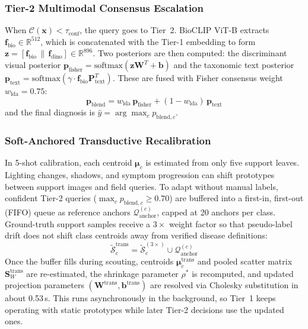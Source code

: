 \documentclass[preprint,12pt]{elsarticle}
\begin{document}
\subsubsection{Tier-2 Multimodal Consensus Escalation}
When $\mathcal{C}(\mathbf{x}) < \tau_{\text{conf}}$, the query goes to Tier~2. BioCLIP ViT-B extracts $\mathbf{f}_{\text{bio}} \in \mathbb{R}^{512}$, which is concatenated with the Tier-1 embedding to form $\mathbf{z} = [\mathbf{f}_{\text{bio}} \,\|\, \mathbf{f}_{\text{dino}}] \in \mathbb{R}^{896}$. Two posteriors are then computed: the discriminant visual posterior $\mathbf{p}_{\text{fisher}} = \text{softmax}(\mathbf{z}\mathbf{W}^T + \mathbf{b})$ and the taxonomic text posterior $\mathbf{p}_{\text{text}} = \text{softmax}(\gamma \cdot \mathbf{f}_{\text{bio}}\mathbf{P}_{\text{text}}^T)$. These are fused with Fisher consensus weight $w_{\text{lda}} = 0.75$:
\begin{equation}
    \label{eq:multimodal_blend}
    \mathbf{p}_{\text{blend}} = w_{\text{lda}} \, \mathbf{p}_{\text{fisher}} + (1 - w_{\text{lda}}) \, \mathbf{p}_{\text{text}}
\end{equation}
and the final diagnosis is $\hat{y} = \arg\max_c p_{\text{blend}, c}$.

\subsubsection{Soft-Anchored Transductive Recalibration}
\label{sec:transductive}
In 5-shot calibration, each centroid $\boldsymbol{\mu}_c$ is estimated from only five support leaves. Lighting changes, shadows, and symptom progression can shift prototypes between support images and field queries. To adapt without manual labels, confident Tier-2 queries ($\max_c p_{\text{blend}, c} \ge 0.70$) are buffered into a first-in, first-out (FIFO) queue as reference anchors $\mathcal{Q}_{\text{anchor}}^{(c)}$, capped at 20 anchors per class. Ground-truth support samples receive a $3\times$ weight factor so that pseudo-label drift does not shift class centroids away from verified disease definitions:
\begin{equation}
    \label{eq:transductive_set}
    \tilde{\mathcal{S}}_c^{\text{trans}} = \tilde{\mathcal{S}}_c^{(3\times)} \cup \mathcal{Q}_{\text{anchor}}^{(c)}
\end{equation}
Once the buffer fills during scouting, centroids $\boldsymbol{\mu}_c^{\text{trans}}$ and pooled scatter matrix $\mathbf{S}_W^{\text{trans}}$ are re-estimated, the shrinkage parameter $\rho^*$ is recomputed, and updated projection parameters $(\mathbf{W}^{\text{trans}}, \mathbf{b}^{\text{trans}})$ are resolved via Cholesky substitution in about 0.53\,s. This runs asynchronously in the background, so Tier~1 keeps operating with static prototypes while later Tier-2 decisions use the updated ones.
\end{document}
